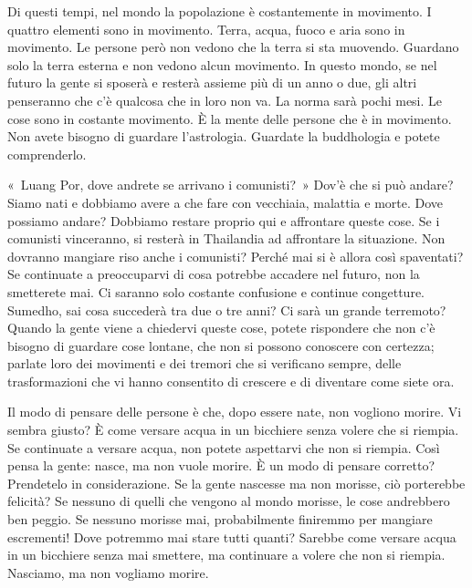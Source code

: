 Di questi tempi, nel mondo la popolazione è costantemente in movimento.
I quattro elementi sono in movimento. Terra, acqua, fuoco e aria sono in
movimento. Le persone però non vedono che la terra si sta muovendo.
Guardano solo la terra esterna e non vedono alcun movimento. In questo
mondo, se nel futuro la gente si sposerà e resterà assieme più di un
anno o due, gli altri penseranno che c'è qualcosa che in loro non va. La
norma sarà pochi mesi. Le cose sono in costante movimento. È la mente
delle persone che è in movimento. Non avete bisogno di guardare
l'astrologia. Guardate la buddhologia e potete comprenderlo.

«~Luang Por, dove andrete se arrivano i comunisti?~» Dov'è che si può
andare? Siamo nati e dobbiamo avere a che fare con vecchiaia, malattia e
morte. Dove possiamo andare? Dobbiamo restare proprio qui e affrontare
queste cose. Se i comunisti vinceranno, si resterà in Thailandia ad
affrontare la situazione. Non dovranno mangiare riso anche i comunisti?
Perché mai si è allora così spaventati? Se continuate a preoccuparvi di
cosa potrebbe accadere nel futuro, non la smetterete mai. Ci saranno
solo costante confusione e continue congetture. Sumedho, sai cosa
succederà tra due o tre anni? Ci sarà un grande terremoto? Quando la
gente viene a chiedervi queste cose, potete rispondere che non c'è
bisogno di guardare cose lontane, che non si possono conoscere con
certezza; parlate loro dei movimenti e dei tremori che si verificano
sempre, delle trasformazioni che vi hanno consentito di crescere e di
diventare come siete ora.

Il modo di pensare delle persone è che, dopo essere nate, non vogliono
morire. Vi sembra giusto? È come versare acqua in un bicchiere senza
volere che si riempia. Se continuate a versare acqua, non potete
aspettarvi che non si riempia. Così pensa la gente: nasce, ma non vuole
morire. È un modo di pensare corretto? Prendetelo in considerazione. Se
la gente nascesse ma non morisse, ciò porterebbe felicità? Se nessuno di
quelli che vengono al mondo morisse, le cose andrebbero ben peggio. Se
nessuno morisse mai, probabilmente finiremmo per mangiare escrementi!
Dove potremmo mai stare tutti quanti? Sarebbe come versare acqua in un
bicchiere senza mai smettere, ma continuare a volere che non si riempia.
Nasciamo, ma non vogliamo morire.

